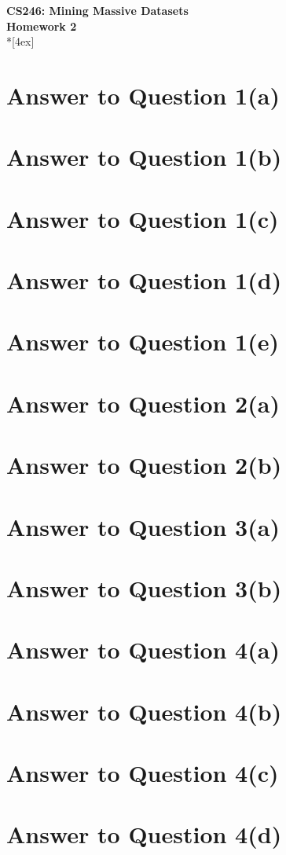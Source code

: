 \documentclass[11pt]{article}
\begin{document}
\thispagestyle{empty}
\parindent 0pt
\vfill
\large

\begin{center}
\LARGE{\bf \textsf{CS246: Mining Massive Datasets}}\\ {\bf \textsf{Homework 2}} 
\\*[4ex]
\end{center}

\section*{Answer to Question 1(a)}

\pagebreak[4]
\section*{Answer to Question 1(b)}

\pagebreak[4]
\section*{Answer to Question 1(c)}

\pagebreak[4]
\section*{Answer to Question 1(d)}


\pagebreak[4]
\section*{Answer to Question 1(e)}

\pagebreak[4]
\section*{Answer to Question 2(a)}

\pagebreak[4]
\section*{Answer to Question 2(b)}

\pagebreak[4]
\section*{Answer to Question 3(a)}

\pagebreak[4]
\section*{Answer to Question 3(b)}

\pagebreak[4]
\section*{Answer to Question 4(a)}

\pagebreak[4]
\section*{Answer to Question 4(b)}

\pagebreak[4]
\section*{Answer to Question 4(c)}

\pagebreak[4]
\section*{Answer to Question 4(d)}
\end{document}
